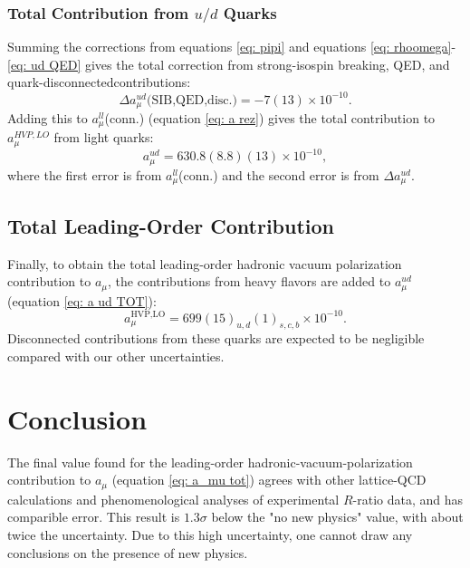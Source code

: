 \documentclass[
a4paper,
10pt,
twoside,
prd,
aps,
nofootinbib,
superscriptaddress,
floatfix,
preprintnumbers,
]{article}
\begin{document}
\subsubsection{Total Contribution from $u/d$ Quarks}

Summing the corrections from equations \ref{eq: pipi} and equations \ref{eq: rhoomega}-\ref{eq: ud QED} gives the total correction from strong-isospin breaking, QED, and quark-disconnectedcontributions:
\begin{equation}
	\Delta a_\mu^{ud} \text{(SIB,QED,disc.)} = -7(13)\times 10^{-10}.
\end{equation}
Adding this to $a_\mu^{ll}$(conn.) (equation \ref{eq: a rez}) gives the total contribution to $a_\mu^{HVP,LO}$ from light quarks:
\begin{equation}
	a_\mu^{ud} = 630.8(8.8)(13) \times 10^{-10},
	\label{eq: a ud TOT}
\end{equation}
where the first error is from $a_\mu^{ll}$(conn.) and the second error is from $\Delta a_\mu^{ud}$.

\subsection{Total Leading-Order Contribution}
\label{sec: total LO contribution}

Finally, to obtain the total leading-order hadronic vacuum polarization contribution to $a_\mu$, the contributions from heavy flavors are added to $a_\mu^{ud}$ (equation \ref{eq: a ud TOT}):
\begin{equation}
	a_\mu^{\text{HVP,LO}} = 699(15)_{u,d} (1)_{s,c,b} \times 10^{-10}.
	\label{eq: a_mu tot}
\end{equation}
Disconnected contributions from these quarks are expected to be negligible compared with our other uncertainties.


\section{Conclusion}

The final value found for the leading-order hadronic-vacuum-polarization contribution to $a_\mu$ (equation \ref{eq: a_mu tot}) agrees with other lattice-QCD calculations and phenomenological analyses of experimental $R$-ratio data, and has comparible error\cite{Davies_2020}.
This result is $1.3\sigma$ below the "no new physics" value, with about twice the uncertainty.
Due to this high uncertainty, one cannot draw any conclusions on the presence of new physics\cite{Davies_2020}.

\nocite{*}
\printbib


\stopmcols
\end{document}
